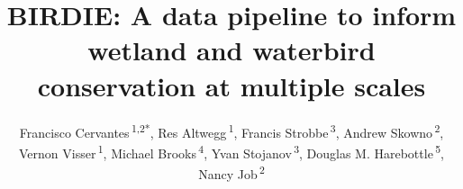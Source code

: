 \documentclass[utf8]{frontiersSCNS}
\def\Authors{
  Francisco Cervantes\,\textsuperscript{1,2*},
  Res Altwegg\,\textsuperscript{1},
  Francis Strobbe\,\textsuperscript{3},
  Andrew Skowno\,\textsuperscript{2},
  Vernon Visser\,\textsuperscript{1},
  Michael Brooks\,\textsuperscript{4},
  Yvan Stojanov\,\textsuperscript{3},
  Douglas M. Harebottle\,\textsuperscript{5},
  Nancy Job\,\textsuperscript{2}}
\def\firstAuthorLast{Cervantes {et~al.}}
\begin{document}
\onecolumn
{}


\title[BIRDIE biodiversity data pipeline]{BIRDIE: A data pipeline to
inform wetland and waterbird conservation at multiple scales}
\author[\firstAuthorLast]{\Authors}
\address{} %
\correspondance{} %

\extraAuth{}%


\maketitle
\end{document}
